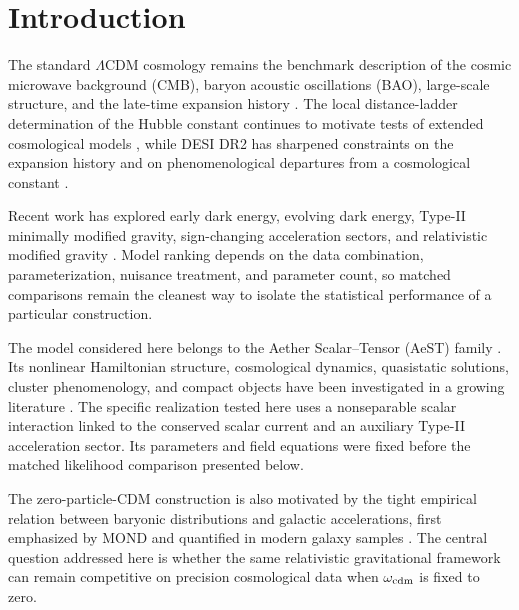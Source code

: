 \documentclass[aps,prd,twocolumn,superscriptaddress,nofootinbib,longbibliography,floatfix]{revtex4-2}
\newcommand{\LCDM}{\Lambda\mathrm{CDM}}
\begin{document}
\section{Introduction}\label{sec:intro}
The standard $\LCDM$ cosmology remains the benchmark description of the cosmic microwave background (CMB), baryon acoustic oscillations (BAO), large-scale structure, and the late-time expansion history \cite{Planck2020VI,DESI2024VI,DESIDR2II2025}. The local distance-ladder determination of the Hubble constant continues to motivate tests of extended cosmological models \cite{Riess2022,Schoneberg2022}, while DESI DR2 has sharpened constraints on the expansion history and on phenomenological departures from a cosmological constant \cite{DESIDR2II2025,DESIDR2Extended2025,Ormondroyd2025,WangMota2025}.

Recent work has explored early dark energy, evolving dark energy, Type-II minimally modified gravity, sign-changing acceleration sectors, and relativistic modified gravity \cite{Poulin2025EDE,Pang2025DDE,DeFeliceMukohyamaPookkillath2021,DeFeliceMaedaMukohyamaPookkillath2022,GanzMartensMukohyamaNamba2023,AkarsuEtAl2024VCDM,AkarsuEtAl2026VCDM,Dixit2026SignSwitch}. Model ranking depends on the data combination, parameterization, nuisance treatment, and parameter count, so matched comparisons remain the cleanest way to isolate the statistical performance of a particular construction.

The model considered here belongs to the Aether Scalar--Tensor (AeST) family \cite{SkordisZlosnik2021,SkordisZlosnik2022}. Its nonlinear Hamiltonian structure, cosmological dynamics, quasistatic solutions, cluster phenomenology, and compact objects have been investigated in a growing literature \cite{BatakiSkordisZlosnik2024,RosaZlosnik2024,VerwayenSkordisBoehm2024,DurakovicSkordis2024,ReyesSakstein2024,ReyesSakstein2025}. The specific realization tested here uses a nonseparable scalar interaction linked to the conserved scalar current and an auxiliary Type-II acceleration sector. Its parameters and field equations were fixed before the matched likelihood comparison presented below.

The zero-particle-CDM construction is also motivated by the tight empirical relation between baryonic distributions and galactic accelerations, first emphasized by MOND and quantified in modern galaxy samples \cite{Milgrom1983,Bekenstein2004,LelliMcGaughSchombert2016,McGaughLelliSchombert2016}. The central question addressed here is whether the same relativistic gravitational framework can remain competitive on precision cosmological data when $\omega_{\rm cdm}$ is fixed to zero.
\end{document}
